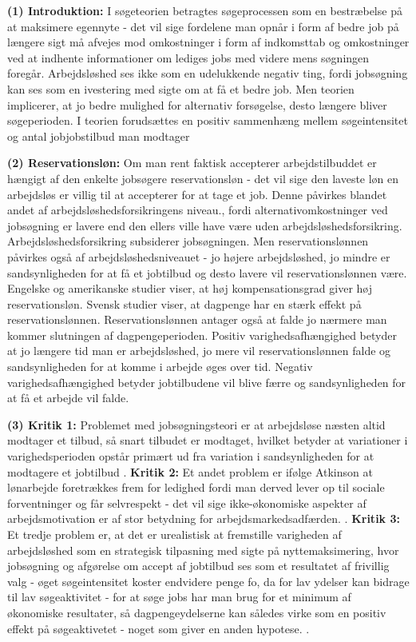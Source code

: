 \textbf{(1) Introduktion:} I søgeteorien betragtes søgeprocessen som en bestræbelse på at maksimere egennyte - det vil sige fordelene man opnår i form af bedre job på længere sigt må afvejes mod omkostninger i form af indkomsttab og omkostninger ved at indhente informationer om lediges jobs med videre mens søgningen foregår. Arbejdsløshed ses ikke som en udelukkende negativ ting, fordi jobsøgning kan ses som en ivestering med sigte om at få et bedre job. Men teorien implicerer, at jo bedre mulighed for alternativ forsøgelse, desto længere bliver søgeperioden. I teorien forudsættes en positiv sammenhæng mellem søgeintensitet og antal jobjobstilbud man modtager \parencite[27-28]{Halvorsen1999}

\textbf{(2) Reservationsløn:} Om man rent faktisk accepterer arbejdstilbuddet er hængigt af den enkelte jobsøgere reservationsløn - det vil sige den laveste løn en arbejdsløs er villig til at accepterer for at tage et job. Denne påvirkes blandet andet af arbejdsløshedsforsikringens niveau., fordi alternativomkostninger ved jobsøgning er lavere end den ellers ville have være uden arbejdsløshedsforsikring. Arbejdsløshedsforsikring subsiderer jobsøgningen. Men reservationslønnen påvirkes også af arbejdsløshedsniveauet - jo højere arbejdsløshed, jo mindre er sandsynligheden for at få et jobtilbud og desto lavere vil reservationslønnen være. Engelske og amerikanske studier viser, at høj kompensationsgrad giver høj reservationsløn. Svensk studier viser, at dagpenge har en stærk effekt på reservationslønnen. Reservationslønnen antager også at falde jo nærmere man kommer slutningen af dagpengeperioden. Positiv varighedsafhængighed betyder at jo længere tid man er arbejdsløshed, jo mere vil reservationslønnen falde og sandsynligheden for at komme i arbejde øges over tid. Negativ varighedsafhængighed betyder jobtilbudene vil blive færre og sandsynligheden for at få et arbejde vil falde. \parencite[28]{Halvorsen1999}

\textbf{(3) Kritik 1:} Problemet med jobsøgningsteori er at arbejdsløse næsten altid modtager et tilbud, så snart tilbudet er modtaget, hvilket betyder at variationer i varighedsperioden opstår primært ud fra variation i sandsynligheden for at modtagere et jobtilbud \parencite[28-29]{Halvorsen1999}. \textbf{Kritik 2:} Et andet problem er ifølge Atkinson at lønarbejde foretrækkes frem for ledighed fordi man derved lever op til sociale forventninger og får selvrespekt - det vil sige ikke-økonomiske aspekter af arbejdsmotivation er af stor betydning for arbejdsmarkedsadfærden. \parencite[29]{Halvorsen1999}. \textbf{Kritik 3:} Et tredje problem er, at det er urealistisk at fremstille varigheden af arbejdsløshed som en strategisk tilpasning med sigte på nyttemaksimering, hvor jobsøgning og afgørelse om accept af jobtilbud ses som et resultatet af frivillig valg - øget søgeintensitet koster endvidere penge fo, da for lav ydelser kan bidrage til lav søgeaktivitet - for at søge jobs har man brug for et minimum af økonomiske resultater, så dagpengeydelserne kan således virke som en positiv effekt på søgeaktivetet - noget som giver en anden hypotese. \parencite[29]{Halvorsen1999}.


